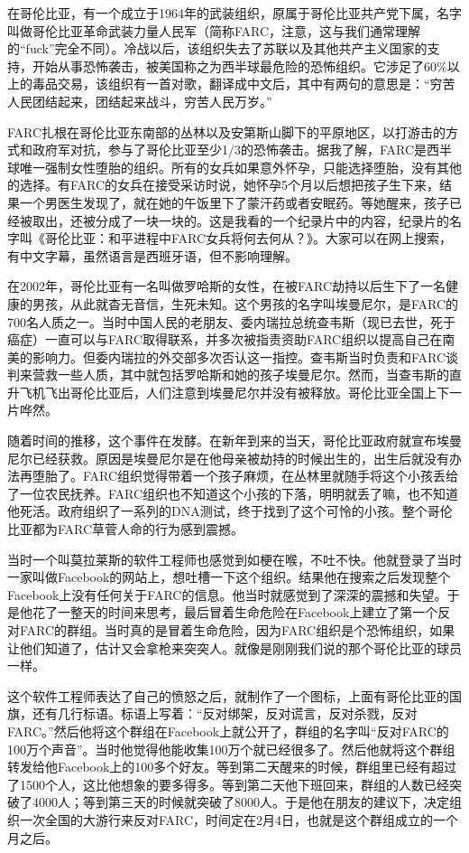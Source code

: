 \documentclass[
  letterpaper,
  DIV=11,
  numbers=noendperiod]{scrreprt}
\begin{document}
在哥伦比亚，有一个成立于1964年的武装组织，原属于哥伦比亚共产党下属，名字叫做哥伦比亚革命武装力量人民军（简称FARC，注意，这与我们通常理解的``fuck''完全不同）。冷战以后，该组织失去了苏联以及其他共产主义国家的支持，开始从事恐怖袭击，被美国称之为西半球最危险的恐怖组织。它涉足了60\%以上的毒品交易，该组织有一首对歌，翻译成中文后，其中有两句的意思是：``穷苦人民团结起来，团结起来战斗，穷苦人民万岁。''

FARC扎根在哥伦比亚东南部的丛林以及安第斯山脚下的平原地区，以打游击的方式和政府军对抗，参与了哥伦比亚至少1/3的恐怖袭击。据我了解，FARC是西半球唯一强制女性堕胎的组织。所有的女兵如果意外怀孕，只能选择堕胎，没有其他的选择。有FARC的女兵在接受采访时说，她怀孕5个月以后想把孩子生下来，结果一个男医生发现了，就在她的午饭里下了蒙汗药或者安眠药。等她醒来，孩子已经被取出，还被分成了一块一块的。这是我看的一个纪录片中的内容，纪录片的名字叫《哥伦比亚：和平进程中FARC女兵将何去何从？》。大家可以在网上搜索，有中文字幕，虽然语言是西班牙语，但不影响理解。

在2002年，哥伦比亚有一名叫做罗哈斯的女性，在被FARC劫持以后生下了一名健康的男孩，从此就杳无音信，生死未知。这个男孩的名字叫埃曼尼尔，是FARC的700名人质之一。当时中国人民的老朋友、委内瑞拉总统查韦斯（现已去世，死于癌症）一直可以与FARC取得联系，并多次被指责资助FARC组织以提高自己在南美的影响力。但委内瑞拉的外交部多次否认这一指控。查韦斯当时负责和FARC谈判来营救一些人质，其中就包括罗哈斯和她的孩子埃曼尼尔。然而，当查韦斯的直升飞机飞出哥伦比亚后，人们注意到埃曼尼尔并没有被释放。哥伦比亚全国上下一片哗然。

随着时间的推移，这个事件在发酵。在新年到来的当天，哥伦比亚政府就宣布埃曼尼尔已经获救。原因是埃曼尼尔是在他母亲被劫持的时候出生的，出生后就没有办法再堕胎了。FARC组织觉得带着一个孩子麻烦，在丛林里就随手将这个小孩丢给了一位农民抚养。FARC组织也不知道这个小孩的下落，明明就丢了嘛，也不知道他死活。政府组织了一系列的DNA测试，终于找到了这个可怜的小孩。整个哥伦比亚都为FARC草菅人命的行为感到震撼。

当时一个叫莫拉莱斯的软件工程师也感觉到如梗在喉，不吐不快。他就登录了当时一家叫做Facebook的网站上，想吐槽一下这个组织。结果他在搜索之后发现整个Facebook上没有任何关于FARC的信息。他当时就感觉到了深深的震撼和失望。于是他花了一整天的时间来思考，最后冒着生命危险在Facebook上建立了第一个反对FARC的群组。当时真的是冒着生命危险，因为FARC组织是个恐怖组织，如果让他们知道了，估计又会拿枪来突突人。就像是刚刚我们说的那个哥伦比亚的球员一样。

这个软件工程师表达了自己的愤怒之后，就制作了一个图标，上面有哥伦比亚的国旗，还有几行标语。标语上写着：``反对绑架，反对谎言，反对杀戮，反对FARC。''然后他将这个群组在Facebook上就公开了，群组的名字叫``反对FARC的100万个声音''。当时他觉得他能收集100万个就已经很多了。然后他就将这个群组转发给他Facebook上的100多个好友。等到第二天醒来的时候，群组里已经有超过了1500个人，这比他想象的要多得多。等到第二天他下班回来，群组的人数已经突破了4000人；等到第三天的时候就突破了8000人。于是他在朋友的建议下，决定组织一次全国的大游行来反对FARC，时间定在2月4日，也就是这个群组成立的一个月之后。
\end{document}
